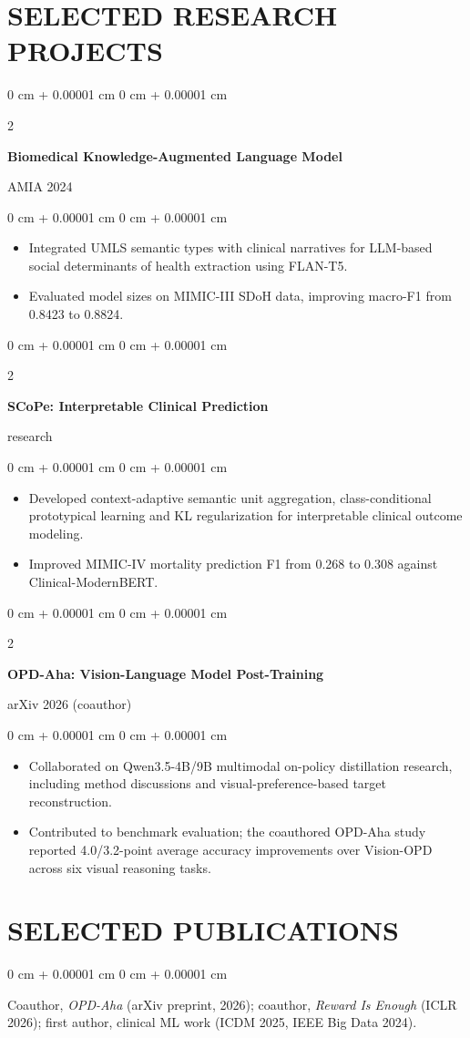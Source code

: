 \documentclass[10pt, letterpaper]{article}
\newenvironment{highlights}{
    \begin{itemize}[
        topsep=0.03 cm,
        parsep=0.03 cm,
        partopsep=0pt,
        itemsep=0pt,
        leftmargin=0 cm + 10pt
    ]
}{
    \end{itemize}
} %
\newenvironment{onecolentry}{
    \begin{adjustwidth}{
        0 cm + 0.00001 cm
    }{
        0 cm + 0.00001 cm
    }
}{
    \end{adjustwidth}
} %
\newenvironment{twocolentry}[2][]{
    \onecolentry
    \def\secondColumn{#2}
    \setcolumnwidth{\fill, 4.5 cm}
    \begin{paracol}{2}
}{
    \switchcolumn \raggedleft \secondColumn
    \end{paracol}
    \endonecolentry
} %
\begin{document}
\section{SELECTED RESEARCH PROJECTS}
\begin{twocolentry}{AMIA 2024}
\textbf{Biomedical Knowledge-Augmented Language Model}
\end{twocolentry}
\begin{onecolentry}
\begin{highlights}
\item Integrated UMLS semantic types with clinical narratives for LLM-based social determinants of health extraction using FLAN-T5.
\item Evaluated model sizes on MIMIC-III SDoH data, improving macro-F1 from 0.8423 to 0.8824.
\end{highlights}
\end{onecolentry}
\vspace{0.03 cm}
\begin{twocolentry}{2026 research}
\textbf{SCoPe: Interpretable Clinical Prediction}
\end{twocolentry}
\begin{onecolentry}
\begin{highlights}
\item Developed context-adaptive semantic unit aggregation, class-conditional prototypical learning and KL regularization for interpretable clinical outcome modeling.
\item Improved MIMIC-IV mortality prediction F1 from 0.268 to 0.308 against Clinical-ModernBERT.
\end{highlights}
\end{onecolentry}
\vspace{0.03 cm}
\begin{twocolentry}{arXiv 2026 (coauthor)}
\textbf{OPD-Aha: Vision-Language Model Post-Training}
\end{twocolentry}
\begin{onecolentry}
\begin{highlights}
\item Collaborated on Qwen3.5-4B/9B multimodal on-policy distillation research, including method discussions and visual-preference-based target reconstruction.
\item Contributed to benchmark evaluation; the coauthored OPD-Aha study reported 4.0/3.2-point average accuracy improvements over Vision-OPD across six visual reasoning tasks.
\end{highlights}
\end{onecolentry}
\vspace{0.03 cm}
\section{SELECTED PUBLICATIONS}
\begin{onecolentry}
Coauthor, \textit{OPD-Aha} (arXiv preprint, 2026); coauthor, \textit{Reward Is Enough} (ICLR 2026); first author, clinical ML work (ICDM 2025, IEEE Big Data 2024).
\end{onecolentry}
\end{document}

